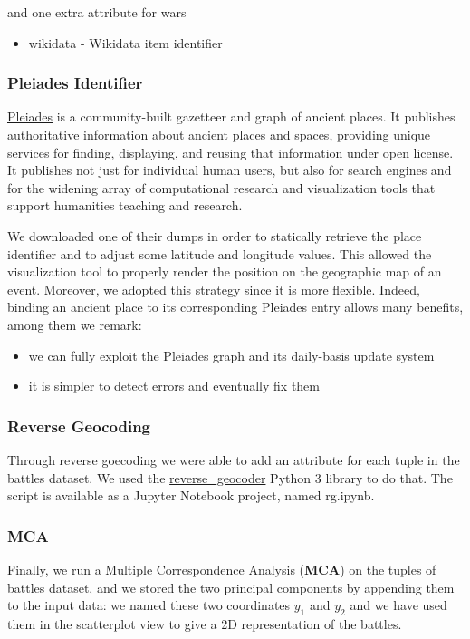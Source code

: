 and one extra attribute for wars
\begin{itemize}
    \item wikidata - Wikidata item identifier
\end{itemize}

\subsubsection{Pleiades Identifier}
\href{https://pleiades.stoa.org}{Pleiades} is a community-built gazetteer and graph of ancient places. It publishes authoritative information about ancient places and spaces, providing unique services for finding, displaying, and reusing that information under open license. It publishes not just for individual human users, but also for search engines and for the widening array of computational research and visualization tools that support humanities teaching and research.

We downloaded one of their dumps in order to statically retrieve the place identifier and to adjust some latitude and longitude values. This allowed the visualization tool to properly render the position on the geographic map of an event. Moreover, we adopted this strategy since it is more flexible. Indeed, binding an ancient place to its corresponding Pleiades entry allows many benefits, among them we remark:
\begin{itemize}
    \item we can fully exploit the Pleiades graph and its daily-basis update system
    \item it is simpler to detect errors and eventually fix them
\end{itemize}

\subsubsection{Reverse Geocoding}
Through reverse goecoding we were able to add an attribute for each tuple in the battles dataset. We used the \href{https://pypi.org/project/reverse_geocoder/}{reverse\_geocoder} Python 3 library to do that. The script is available as a Jupyter Notebook project, named rg.ipynb.

\subsubsection{MCA}
Finally, we run a Multiple Correspondence Analysis (\textbf{MCA}) \cite{HD07} on the tuples of battles dataset, and we stored the two principal components by appending them to the input data: we named these two coordinates $y_1$ and $y_2$ and we have used them in the scatterplot view to give a 2D representation of the battles.

